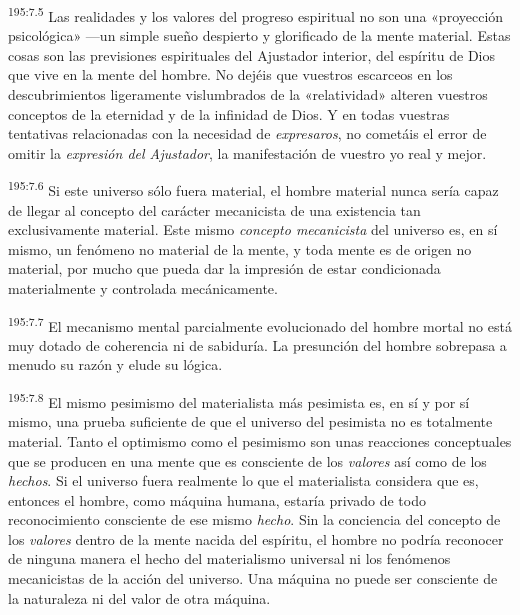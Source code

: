 \par
\textsuperscript{195:7.5} Las realidades y los valores del progreso espiritual no son una «proyección psicológica» ---un simple sueño despierto y glorificado de la mente material. Estas cosas son las previsiones espirituales del Ajustador interior, del espíritu de Dios que vive en la mente del hombre. No dejéis que vuestros escarceos en los descubrimientos ligeramente vislumbrados de la «relatividad» alteren vuestros conceptos de la eternidad y de la infinidad de Dios. Y en todas vuestras tentativas relacionadas con la necesidad de \textit{expresaros}, no cometáis el error de omitir la \textit{expresión del Ajustador}, la manifestación de vuestro yo real y mejor.

\par
\textsuperscript{195:7.6} Si este universo sólo fuera material, el hombre material nunca sería capaz de llegar al concepto del carácter mecanicista de una existencia tan exclusivamente material. Este mismo \textit{concepto mecanicista} del universo es, en sí mismo, un fenómeno no material de la mente, y toda mente es de origen no material, por mucho que pueda dar la impresión de estar condicionada materialmente y controlada mecánicamente.

\par
\textsuperscript{195:7.7} El mecanismo mental parcialmente evolucionado del hombre mortal no está muy dotado de coherencia ni de sabiduría. La presunción del hombre sobrepasa a menudo su razón y elude su lógica.

\par
\textsuperscript{195:7.8} El mismo pesimismo del materialista más pesimista es, en sí y por sí mismo, una prueba suficiente de que el universo del pesimista no es totalmente material. Tanto el optimismo como el pesimismo son unas reacciones conceptuales que se producen en una mente que es consciente de los \textit{valores} así como de los \textit{hechos}. Si el universo fuera realmente lo que el materialista considera que es, entonces el hombre, como máquina humana, estaría privado de todo reconocimiento consciente de ese mismo \textit{hecho}. Sin la conciencia del concepto de los \textit{valores} dentro de la mente nacida del espíritu, el hombre no podría reconocer de ninguna manera el hecho del materialismo universal ni los fenómenos mecanicistas de la acción del universo. Una máquina no puede ser consciente de la naturaleza ni del valor de otra máquina.

